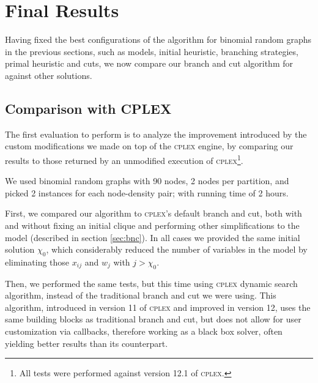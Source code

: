 \section{Final Results}

Having fixed the best configurations of the algorithm for binomial random graphs in the previous sections, such as models, initial heuristic, branching strategies, primal heuristic and cuts, we now compare our branch and cut algorithm for \PCP{} against other solutions.

\subsection{Comparison with CPLEX}

The first evaluation to perform is to analyze the improvement introduced by the custom modifications we made on top of the \textsc{cplex} engine, by comparing our results to those returned by an unmodified execution of \textsc{cplex}\footnote{All tests were performed against version 12.1 of \textsc{cplex}.}. 

We used binomial random graphs with 90 nodes, 2 nodes per partition, and picked 2 instances for each node-density pair; with running time of 2 hours.

First, we compared our algorithm to \textsc{cplex}'s default branch and cut, both with and without fixing an initial clique and performing other simplifications to the model (described in section \ref{sec:bnc}). In all cases we provided the same initial solution $\chi_0$, which considerably reduced the number of variables in the model by eliminating those $x_{ij}$ and $w_j$ with $j > \chi_0$.

Then, we performed the same tests, but this time using \textsc{cplex} dynamic search algorithm, instead of the traditional branch and cut we were using. This algorithm, introduced in version 11 of \textsc{cplex} and improved in version 12, uses the same building blocks as traditional branch and cut, but does not allow for user customization via callbacks, therefore working as a black box solver, often yielding better results than its counterpart.

